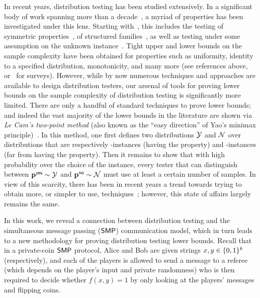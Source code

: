 In recent years, distribution testing has been studied extensively. In a significant body of work spanning more than a decade~\cite{BFFKRW:01,Paninski:04,BDKR:05,Paninski:08,ADJOP:11,BFRV:11,LRR:13,VV:14,CDVV:14,WY:14,JVW:14,BV:15,DK:16}, a myriad of properties has been investigated under this lens. Starting with~\cite{GRexp:00,BFRSW:10,BFFKRW:01}, this includes the testing of symmetric properties~\cite{RRSS:09,Valiant:11,ValiantValiant:11:stoc,ValiantValiant:11}, of structured families~\cite{BKR:04,ILR:12,AD:15,Canonne:15,ADK:15,CDGR:16,Canonne:16}, as well as testing under some assumption on the unknown instance~\cite{RS:09,DDSV:13,DKN:15,DKN:15:FOCS}. Tight upper and lower bounds on the sample complexity have been obtained for properties such as uniformity, identity to a specified distribution, monotonicity, and many more (see references above, or~\cite{Rubinfeld:12:Survey,Canonne:15:Survey} for surveys).
 However, while by now numerous techniques and approaches are available to design distribution testers, our arsenal of tools for proving lower bounds on the sample complexity of distribution testing is significantly more limited. There are only a handful of standard techniques to prove lower bounds; and indeed the vast majority of the lower bounds in the literature are shown via \emph{Le Cam's two-point method} (also known as the ``easy direction'' of Yao's minimax principle)~\cite{Yu:97,Pollard:2003}. In this method, one first defines two distributions $\cal Y$ and $\cal N$ over distributions that are respectively \yes-instances (having the property) and \no-instances (far from having the property). Then it remains to show that with high probability over the choice of the instance, every tester that can distinguish between $\mathbf{p}^{\textsf{yes}} \sim \cal Y$ and $\mathbf{p}^{\textsf{no}} \sim \cal N$ must use at least a certain number of samples. In view of this scarcity, there has been in recent years a trend towards trying to obtain more, or simpler to use, techniques~\cite{Valiant:11,DK:16}; however, this state of affairs largely remains the same.

In this work, we reveal a connection between distribution testing and the simultaneous message passing ($\mathsf{SMP}$) communication model, which in turn leads to a new methodology for proving distribution testing lower bounds. Recall that in a private-coin $\mathsf{SMP}$ protocol, Alice and Bob are given strings $x,y \in \{0,1\}^k$ (respectively), and each of the players is allowed to send a message to a referee (which depends on the player's input and private randomness) who is then required to decide whether $f(x,y)=1$ by only looking at the players' messages and flipping coins.


